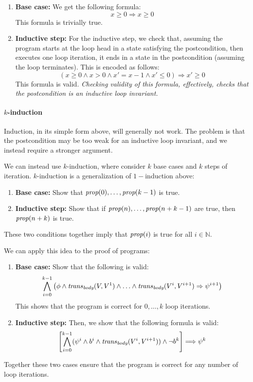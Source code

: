 \documentclass{amsart}
\theoremstyle{definition}
\theoremstyle{remark}
\numberwithin{equation}{section}
\begin{document}
\begin{enumerate}
  \item \textbf{Base case:}
  We get the following
  formula:
  $$x \geq 0 \Rightarrow x \geq 0$$
  This formula is trivially true.

  \item \textbf{Inductive step:}
  For the inductive step, we check that,
  assuming the program starts at the loop head
  in a state satisfying the postcondition,
  then executes one loop iteration,
  it ends in a state in the postcondition (assuming the loop terminates).
  This is encoded as follows:
  $$(x \geq 0 \land x > 0 \land x' = x - 1 \land x' \leq 0) \Rightarrow x' \geq 0$$
  This formula is valid.
  \emph{Checking validity of this formula, effectively, checks that
  the postcondition is an inductive loop invariant.}
\end{enumerate}

\paragraph{$k$-induction}
%
Induction, in its simple form above, will generally
not work.
The problem is that the postcondition may be too weak
for an inductive loop invariant, and we instead
require a stronger argument.

We can instead use $k$-induction, where consider
$k$ base cases and $k$ steps of iteration.
$k$-induction is a generalization of $1-$induction
above:

\begin{enumerate}
  \item \textbf{Base case:}
  Show that $\emph{prop}(0),\ldots,\emph{prop}(k-1)$ is true.

  \item \textbf{Inductive step:}
  Show that if $\emph{prop}(n),\ldots,\emph{prop}(n+k-1)$
  are true, then $\emph{prop}(n+k)$ is true.
\end{enumerate}
These two conditions together imply that
$\emph{prop}(i)$ is true for all $i \in \mathbb{N}$.

We can apply this idea to the proof of programs:

\begin{enumerate}
  \item \textbf{Base case:}
  Show that the following is valid:
  \begin{align*}
    \bigwedge_{i=0}^{k-1} \left(\phi \land \mathit{trans}_{\emph{body}}(V,V^1) \land \ldots \land \mathit{trans}_{\emph{body}}(V^i,V^{i+1}) \Rightarrow \psi^{i+1}\right)
  \end{align*}
  This shows that the program is correct for $0,\ldots,k$
  loop iterations.

  \item \textbf{Inductive step:}
  Then, we show that the following formula is valid:
  \begin{align*}
    \left[\bigwedge_{i=0}^{k-1}(
    \psi^{i} \land b^i \land  \mathit{trans}_{\emph{body}}(V^i,V^{i+1}))
    \land \neg b^{k} \right] \Longrightarrow \psi^k
  \end{align*}
\end{enumerate}
Together these two cases ensure that the program
is correct for any number of loop iterations.
\end{document}

